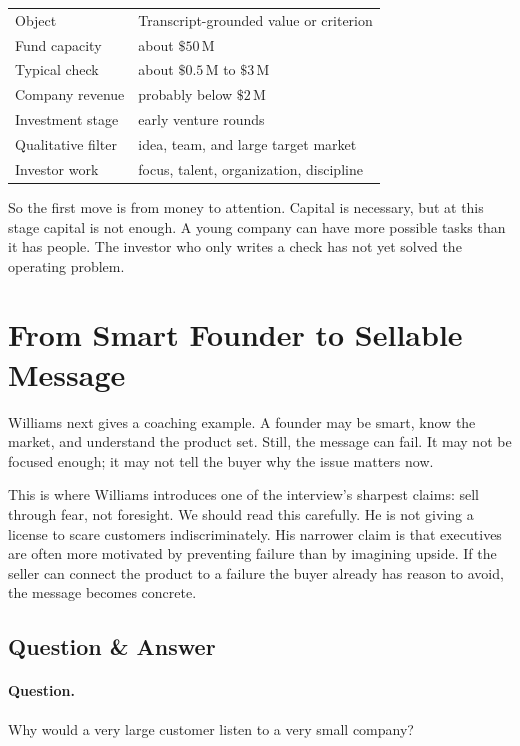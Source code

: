 \begin{table}
\centering
\begin{tabular}{p{.38\linewidth}p{.5\linewidth}}
Object & Transcript-grounded value or criterion \\
Fund capacity & about \(\$50\,\mathrm{M}\) \\
Typical check & about \(\$0.5\,\mathrm{M}\) to \(\$3\,\mathrm{M}\) \\
Company revenue & probably below \(\$2\,\mathrm{M}\) \\
Investment stage & early venture rounds \\
Qualitative filter & idea, team, and large target market \\
Investor work & focus, talent, organization, discipline \\
\end{tabular}
\end{table}

So the first move is from money to attention. Capital is necessary, but at this stage capital is not enough. A young company can have more possible tasks than it has people. The investor who only writes a check has not yet solved the operating problem.

\section{From Smart Founder to Sellable Message}

Williams next gives a coaching example. A founder may be smart, know the market, and understand the product set. Still, the message can fail. It may not be focused enough; it may not tell the buyer why the issue matters now.

This is where Williams introduces one of the interview's sharpest claims: sell through fear, not foresight. We should read this carefully. He is not giving a license to scare customers indiscriminately. His narrower claim is that executives are often more motivated by preventing failure than by imagining upside. If the seller can connect the product to a failure the buyer already has reason to avoid, the message becomes concrete.

\subsection{Question \& Answer}

\paragraph{Question.} Why would a very large customer listen to a very small company?

